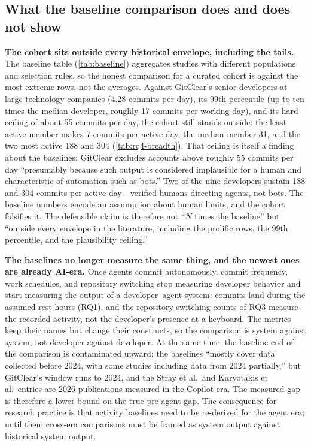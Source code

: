 
\subsection{What the baseline comparison does and does not show}
\label{sec:baseline-comparison}

\textbf{The cohort sits outside every historical envelope, including the tails.}
The baseline table (\autoref{tab:baseline}) aggregates studies with different
populations and selection rules, so the honest comparison for a curated cohort is
against the most extreme rows, not the averages.
Against GitClear's senior developers at large technology companies (4.28 commits
per day), its 99th percentile (up to ten times the median developer, roughly 17
commits per working day), and its hard ceiling of about 55 commits per day, the
cohort still stands outside: the least active member makes 7 commits per active
day, the median member 31, and the two most active 188 and 304
(\autoref{tab:rq4-breadth}).
That ceiling is itself a finding about the baselines: GitClear excludes accounts
above roughly 55 commits per day ``presumably because such output is considered
implausible for a human and characteristic of automation such as bots.''
Two of the nine developers sustain 188 and 304 commits per active day---verified
humans directing agents, not bots.
The baseline numbers encode an assumption about human limits, and the cohort
falsifies it.
The defensible claim is therefore not ``$N$ times the baseline'' but ``outside
every envelope in the literature, including the prolific rows, the 99th
percentile, and the plausibility ceiling.''

\textbf{The baselines no longer measure the same thing, and the newest ones are
already AI-era.}
Once agents commit autonomously, commit frequency, work schedules, and repository
switching stop measuring developer behavior and start measuring the output of a
developer--agent system: commits land during the assumed rest hours (RQ1), and
the repository-switching counts of RQ3 measure the recorded activity, not the
developer's presence at a keyboard.
The metrics keep their names but change their constructs, so the comparison is
system against system, not developer against developer.
At the same time, the baseline end of the comparison is contaminated upward: the
baselines ``mostly cover data collected before 2024, with some studies including
data from 2024 partially,'' but GitClear's window runs to 2024, and the Stray
et al.\ and Karyotakis et al.\ entries are 2026 publications measured in the
Copilot era.
The measured gap is therefore a lower bound on the true pre-agent gap.
The consequence for research practice is that activity baselines need to be
re-derived for the agent era; until then, cross-era comparisons must be framed
as system output against historical system output.

